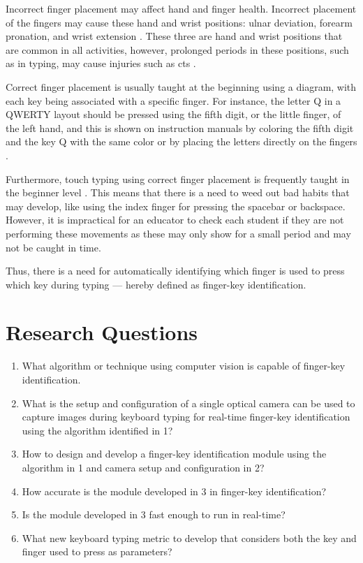 \documentclass{report}
\begin{document}
Incorrect finger placement may affect hand and finger health. Incorrect
placement of the fingers may cause these hand and wrist positions: ulnar
deviation, forearm pronation, and wrist extension \parencite{serina1999}. These
three are hand and wrist positions that are common in all activities, however,
prolonged periods in these positions, such as in typing, may cause injuries such
as \ac{cts} \parencite{toosi2015}.

Correct finger placement is usually taught at the beginning using a diagram,
with each key being associated with a specific finger. For instance, the letter
Q in a QWERTY layout should be pressed using the fifth digit, or the little
finger, of the left hand, and this is shown on instruction manuals by coloring
the fifth digit and the key Q with the same color or by placing the letters
directly on the fingers \parencite{dobson2009touch}.

Furthermore, touch typing using correct finger placement is frequently taught in
the beginner level \parencite{donica2018}. This means that there is a need to
weed out bad habits that may develop, like using the index finger for pressing
the spacebar or backspace. However, it is impractical for an educator to check
each student if they are not performing these movements as these may only show
for a small period and may not be caught in time.

Thus, there is a need for automatically identifying which finger is used to
press which key during typing --- hereby defined as finger-key identification.

\section{Research Questions}
\begin{enumerate}
	\item What algorithm or technique using computer vision is capable of
	      finger-key identification.
	\item What is the setup and configuration of a single optical camera can be
	      used to capture images during keyboard typing for real-time finger-key
	      identification using the algorithm identified in 1?
	\item How to design and develop a finger-key identification module using
	      the algorithm in 1 and camera setup and configuration in 2?
	\item How accurate is the module developed in 3 in finger-key identification?
	\item Is the module developed in 3 fast enough to run in real-time?
	\item What new keyboard typing metric to develop that considers both the key and
	      finger used to press as parameters?
\end{enumerate}
\end{document}
